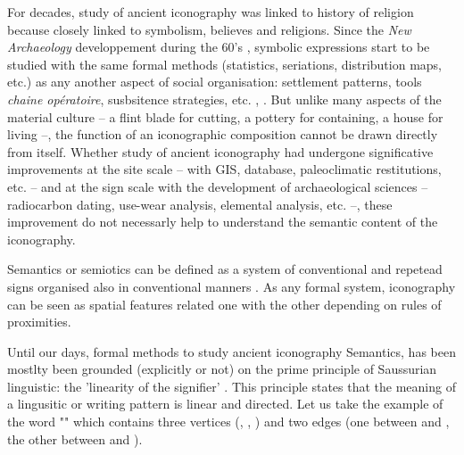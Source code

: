 \documentclass[article]{jss}
\begin{document}
For decades, study of ancient iconography was linked to history of religion because closely linked to symbolism, believes and religions. Since the \textit{New Archaeology} developpement during the 60's \citep{Clarke14}, symbolic expressions start to be studied with the same formal methods (statistics, seriations, distribution maps, etc.) as any another aspect of social organisation: settlement patterns, tools \emph{chaine opératoire}, susbsitence strategies, etc. \citep{Renfrew91}, \citep{LeroiGourhan92}. But unlike many aspects of the material culture -- a flint blade for cutting, a pottery for containing, a house for living --, the function of an iconographic composition cannot be drawn directly from itself. Whether study of ancient iconography had  undergone significative improvements at the site scale -- with GIS, database, paleoclimatic restitutions, etc. -- and at the sign scale with the development of archaeological sciences -- radiocarbon dating, use-wear analysis, elemental analysis, etc. --, these improvement do not necessarly help to understand the semantic content of the iconography.

Semantics or semiotics can be defined as a system of conventional and repetead signs organised also in conventional manners . As any formal system, iconography can be seen as spatial features related one with the other depending on rules of proximities. 

Until our days, formal methods to study ancient iconography Semantics, has been mostlty been grounded (explicitly or not) on the prime principle of Saussurian linguistic: the 'linearity of the signifier' \citep{Saussure89}. This principle states that the meaning of a lingusitic or writing pattern is linear and directed. Let us take the example of the word "" which contains three vertices (, , ) and two edges (one between  and , the other between  and ). 
\end{document}
